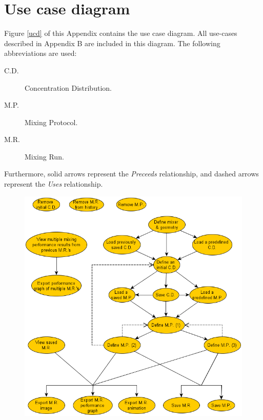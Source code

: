 \chapter{Use case diagram}

Figure \ref{ucd} of this Appendix contains the use case diagram. All use-cases described in Appendix B are included in this diagram. The following abbreviations are used:
\begin{description}
\item[C.D.] Concentration Distribution.
\item[M.P.] Mixing Protocol.
\item[M.R.] Mixing Run.
\end{description}

Furthermore, solid arrows represent the \emph{Preceeds} relationship, and dashed arrows represent the \emph{Uses} relationship.

\begin{figure}[h!]
\begin{center}
\includegraphics[keepaspectratio=true,width=800 pt,height=508 pt]{UseCaseDiagram.png}
\end{center}
\end{figure}
